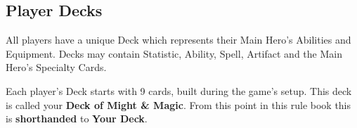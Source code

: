 
\begin{multicols*}{2}

\subsection*{\hypertarget{Playerdecks}{Player Decks}}
All players have a unique Deck which represents their Main Hero's Abilities and Equipment.
Decks may contain Statistic, Ability, Spell, Artifact and the Main Hero's Specialty Cards.

Each player's Deck starts with 9 cards, built during the game's setup.
This deck is called your \textbf{Deck of Might \& Magic}. From this point in this rule book this is \textbf{shorthanded} to \textbf{Your Deck}.

\end{multicols*}
